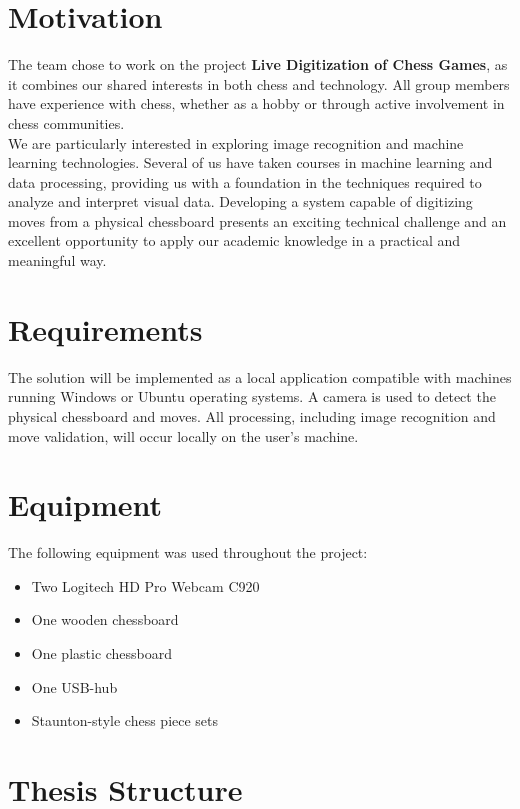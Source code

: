 \section{Motivation}

The team chose to work on the project \textbf{Live Digitization of Chess Games}, as it combines our shared interests in both chess and technology. All group members have experience with chess, whether as a hobby or through active involvement in chess communities. \\

We are particularly interested in exploring image recognition and machine learning technologies. Several of us have taken courses in machine learning and data processing, providing us with a foundation in the techniques required to analyze and interpret visual data. Developing a system capable of digitizing moves from a physical chessboard presents an exciting technical challenge and an excellent opportunity to apply our academic knowledge in a practical and meaningful way.

\section{Requirements}

The solution will be implemented as a local application compatible with machines running Windows or Ubuntu operating systems. A camera is used to detect the physical chessboard and moves. All processing, including image recognition and move validation, will occur locally on the user's machine.

\newpage

\section{Equipment}
The following equipment was used throughout the project:

\begin{itemize}
    \item Two Logitech HD Pro Webcam C920
    \item One wooden chessboard
    \item One plastic chessboard
    \item One USB-hub
    \item Staunton-style chess piece sets
\end{itemize}

\section{Thesis Structure}

